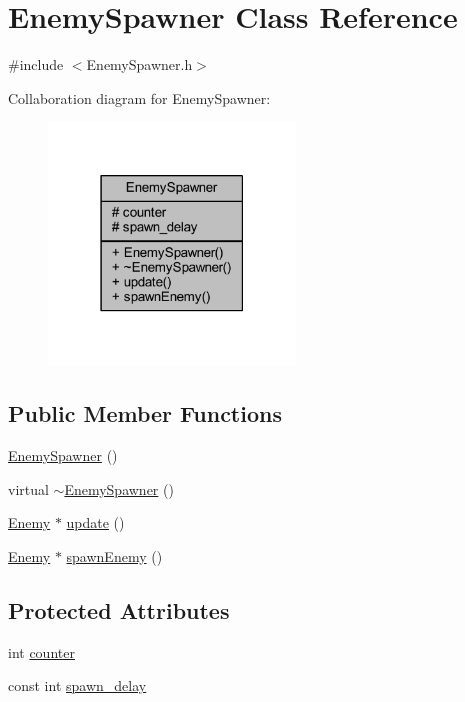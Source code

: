 \hypertarget{class_enemy_spawner}{}\section{Enemy\+Spawner Class Reference}
\label{class_enemy_spawner}


{\ttfamily \#include $<$Enemy\+Spawner.\+h$>$}



Collaboration diagram for Enemy\+Spawner\+:\nopagebreak
\begin{figure}[H]
\begin{center}
\leavevmode
\includegraphics[width=186pt]{class_enemy_spawner__coll__graph}
\end{center}
\end{figure}
\subsection*{Public Member Functions}
\begin{DoxyCompactItemize}
\item 
\hyperlink{class_enemy_spawner_a4c3dac46ddd4f9e97bac15cf42b2f931}{Enemy\+Spawner} ()
\item 
virtual \hyperlink{class_enemy_spawner_a661639d8aa3e52a1249883c34d11f0ad}{$\sim$\+Enemy\+Spawner} ()
\item 
\hyperlink{class_enemy}{Enemy} $\ast$ \hyperlink{class_enemy_spawner_a1b00731679380c088027072b11583d6c}{update} ()
\item 
\hyperlink{class_enemy}{Enemy} $\ast$ \hyperlink{class_enemy_spawner_adc9ba92ad7028dc28e1599fea871e132}{spawn\+Enemy} ()
\end{DoxyCompactItemize}
\subsection*{Protected Attributes}
\begin{DoxyCompactItemize}
\item 
int \hyperlink{class_enemy_spawner_a10072a5aab9a1d055df222ee0ef3fe6e}{counter}
\item 
const int \hyperlink{class_enemy_spawner_a925cbf3cbaadaf7b376ef6aadc955d7f}{spawn\+\_\+delay}
\end{DoxyCompactItemize}


